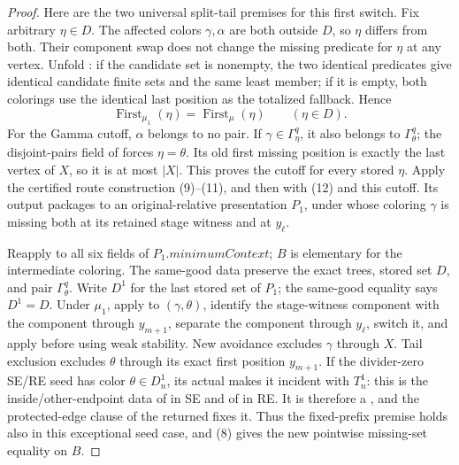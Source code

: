 \begin{proof}
Here are the two universal split-tail premises for this first switch.
Fix arbitrary \(\eta\in D\).  The affected colors \(\gamma,\alpha\) are
both outside \(D\), so \(\eta\) differs from both.  Their component swap
does not change the missing predicate for \(\eta\) at any vertex.  Unfold
: if the candidate set is nonempty,
the two identical predicates give identical candidate finite sets and the
same least member; if it is empty, both colorings use the identical last
position as the totalized fallback.  Hence
\[
 \operatorname{First}_{\mu_1}(\eta)=\operatorname{First}_{\mu}(\eta)
                         \qquad(\eta\in D).                     \tag{12}
\]
For the Gamma cutoff, \(\alpha\) belongs to no pair.  If
\(\gamma\in\Gamma^q_\eta\), it also belongs to
\(\Gamma^q_\theta\); the disjoint-pairs field of
 forces \(\eta=\theta\).  Its old first missing
position is exactly the last vertex of \(X\), so it is at most \(|X|\).
This proves the cutoff for every stored \(\eta\).  Apply the certified
route construction (9)--(11), and then
 with (12) and this cutoff.  Its
output packages to an original-relative presentation \(P_1\), under whose
coloring \(\gamma\) is missing both at its retained stage witness and at
\(y_\ell\).

Reapply  to all six
fields of \(P_1.\mathit{minimumContext}\); \(B\) is elementary for the
intermediate coloring.  The same-good data preserve the exact trees,
stored set \(D\), and pair \(\Gamma^q_\theta\).  Write \(D^1\) for the
last stored set of \(P_1\); the same-good equality says \(D^1=D\).
Under \(\mu_1\), apply
 to \((\gamma,\theta)\), identify the stage-witness
component with the component through \(y_{m+1}\), separate the component
through \(y_\ell\), switch it, and apply
 before using weak stability.  New
avoidance excludes \(\gamma\) through \(X\).  Tail exclusion excludes
\(\theta\) through its exact first position \(y_{m+1}\).  If the
divider-zero SE/RE seed has color \(\theta\in D_n^1\), its actual
 makes it incident with \(T_n^1\): this is
the inside/other-endpoint data of  in SE
and of  in RE.  It is therefore a
, and the protected-edge clause of the returned
 fixes it.  Thus the fixed-prefix premise holds
also in this exceptional seed case, and (8) gives the new pointwise
missing-set equality on \(B\).


\end{proof}
